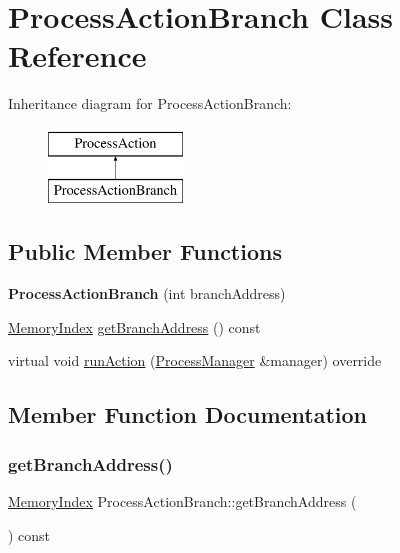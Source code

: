 \hypertarget{classProcessActionBranch}{}\section{Process\+Action\+Branch Class Reference}
\label{classProcessActionBranch}
Inheritance diagram for Process\+Action\+Branch\+:\begin{figure}[H]
\begin{center}
\leavevmode
\includegraphics[height=2.000000cm]{classProcessActionBranch}
\end{center}
\end{figure}
\subsection*{Public Member Functions}
\begin{DoxyCompactItemize}
\item 
\mbox{\label{classProcessActionBranch_af07066ed151e010ed2231436c98bb0b7}} 
{\bfseries Process\+Action\+Branch} (int branch\+Address)
\item 
\hyperlink{classMemoryIndex}{Memory\+Index} \hyperlink{classProcessActionBranch_a692987ed51a14885871a55cd08a994f0}{get\+Branch\+Address} () const
\item 
virtual void \hyperlink{classProcessActionBranch_a2aadd61680b350a4b9112ff3757f1944}{run\+Action} (\hyperlink{classProcessManager}{Process\+Manager} \&manager) override
\end{DoxyCompactItemize}


\subsection{Member Function Documentation}
\mbox{\label{classProcessActionBranch_a692987ed51a14885871a55cd08a994f0}} 
\subsubsection{\texorpdfstring{get\+Branch\+Address()}{getBranchAddress()}}
{\footnotesize\ttfamily \hyperlink{classMemoryIndex}{Memory\+Index} Process\+Action\+Branch\+::get\+Branch\+Address (\begin{DoxyParamCaption}{ }\end{DoxyParamCaption}) const}

